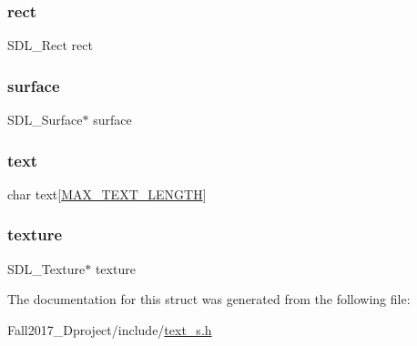 \subsubsection{\texorpdfstring{rect}{rect}}
{\footnotesize\ttfamily S\+D\+L\+\_\+\+Rect rect}

\mbox{\label{structtextdisplay__s_a2f5cac12e913bcfcff660305bf88dd3b}} 
\subsubsection{\texorpdfstring{surface}{surface}}
{\footnotesize\ttfamily S\+D\+L\+\_\+\+Surface$\ast$ surface}

\mbox{\label{structtextdisplay__s_a4746722d9d13b9cdc8b2146221816d54}} 
\subsubsection{\texorpdfstring{text}{text}}
{\footnotesize\ttfamily char text\mbox{[}\hyperlink{text__s_8h_a9a90baeac9b3273d185357200b599b39}{M\+A\+X\+\_\+\+T\+E\+X\+T\+\_\+\+L\+E\+N\+G\+TH}\mbox{]}}

\mbox{\label{structtextdisplay__s_a859b8efbf9abe8e82757ee5c75a0c97c}} 
\subsubsection{\texorpdfstring{texture}{texture}}
{\footnotesize\ttfamily S\+D\+L\+\_\+\+Texture$\ast$ texture}



The documentation for this struct was generated from the following file\+:\begin{DoxyCompactItemize}
\item 
Fall2017\+\_\+Dproject/include/\hyperlink{text__s_8h}{text\+\_\+s.\+h}\end{DoxyCompactItemize}
